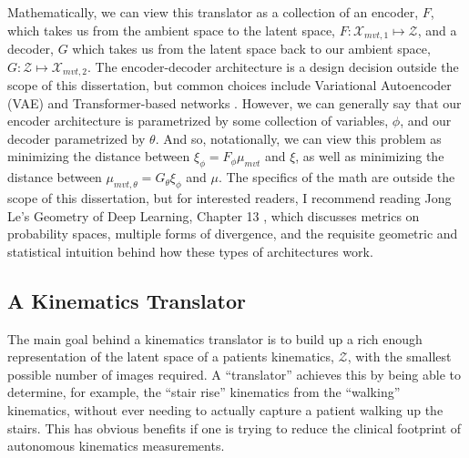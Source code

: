 Mathematically, we can view this translator as a collection of an encoder, $F$, which takes us from the ambient space to the latent space, $F: \mathcal{X}_{mvt,1} \mapsto \mathcal{Z}$, and a decoder, $G$ which takes us from the latent space back to our ambient space, $G: \mathcal{Z} \mapsto \mathcal{X}_{mvt,2}$. The encoder-decoder architecture is a design decision outside the scope of this dissertation, but common choices include Variational Autoencoder (VAE) and Transformer-based networks \cite{vaswaniAttentionAllYou2017}.
However, we can generally say that our encoder architecture is parametrized by some collection of variables, $\phi$, and our decoder parametrized by $\theta$.
And so, notationally, we can view this problem as minimizing the distance between $\xi_{\phi} = F_{\phi}\mu_{mvt}$ and $\xi$, as well as minimizing the distance between $\mu_{mvt,\theta} = G_{\theta}\xi_{\phi}$ and $\mu$.
The specifics of the math are outside the scope of this dissertation, but for interested readers, I recommend reading Jong Le's Geometry of Deep Learning, Chapter 13 \cite{yeGeometryDeepLearning2022}, which discusses metrics on probability spaces, multiple forms of divergence, and the requisite geometric and statistical intuition behind how these types of architectures work.

\subsection{A Kinematics Translator}
The main goal behind a kinematics translator is to build up a rich enough representation of the latent space of a patients kinematics, $\mathcal{Z}$, with the smallest possible number of images required.
A ``translator'' achieves this by being able to determine, for example, the ``stair rise'' kinematics from the ``walking'' kinematics, without ever needing to actually capture a patient walking up the stairs.
This has obvious benefits if one is trying to reduce the clinical footprint of autonomous kinematics measurements.

